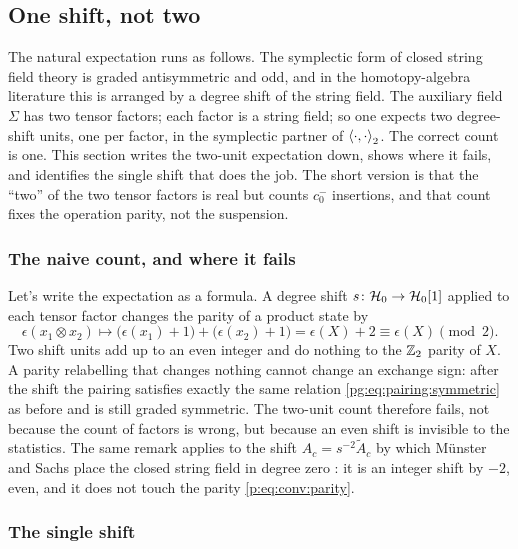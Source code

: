 \subsection{One shift, not two}
\label{pg:sec:grading}

The natural expectation runs as follows.
The symplectic form of closed string field theory is graded antisymmetric and odd, and in the homotopy-algebra literature this is arranged by a degree shift of the string field.
The auxiliary field $\Sigma$ has two tensor factors; each factor is a string field; so one expects two degree-shift units, one per factor, in the symplectic partner of $\braket{\cdot,\cdot}_2$.
The correct count is one.
This section writes the two-unit expectation down, shows where it fails, and identifies the single shift that does the job.
The short version is that the \enquote{two} of the two tensor factors is real but counts $c_0^-$ insertions, and that count fixes the operation parity, not the suspension.

\subsubsection{The naive count, and where it fails}
\label{pg:sec:grading:naive}

Let's write the expectation as a formula.
A degree shift $s\colon{\mathcal{H}}_0\to{\mathcal{H}}_0[1]$ applied to each tensor factor changes the parity of a product state by
\begin{equation}
  \epsilon(x_1 \otimes x_2)
    \longmapsto
    \big( \epsilon(x_1) + 1 \big) + \big( \epsilon(x_2) + 1 \big)
    = \epsilon(X) + 2
    \equiv \epsilon(X) \pmod 2 .
\end{equation}
Two shift units add up to an even integer and do nothing to the $\mathbb{Z}_2$ parity of $X$.
A parity relabelling that changes nothing cannot change an exchange sign: after the shift the pairing satisfies exactly the same relation \eqref{pg:eq:pairing:symmetric} as before and is still graded symmetric.
The two-unit count therefore fails, not because the count of factors is wrong, but because an even shift is invisible to the statistics.
The same remark applies to the shift $A_c=s^{-2}\tilde A_c$ by which Münster and Sachs place the closed string field in degree zero \cite{Muenster:2012:HomotopyAlgebrasString-kn,Muenster:2013:HomotopyAlgebrasQuantum}: it is an integer shift by $-2$, even, and it does not touch the parity \eqref{p:eq:conv:parity}.

\subsubsection{The single shift}
\label{pg:sec:grading:single}

